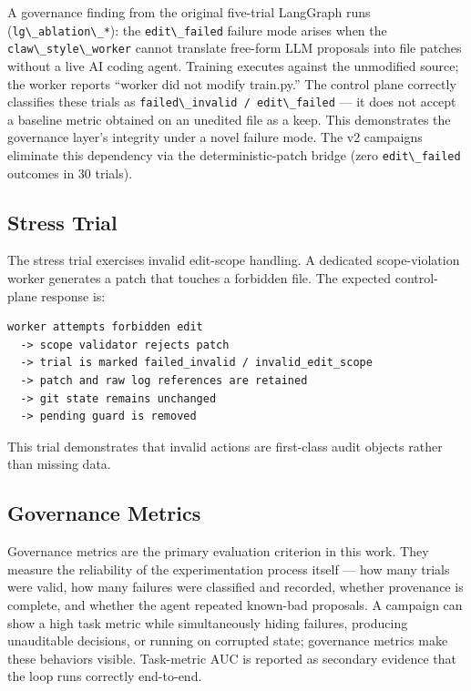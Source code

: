A governance finding from the original five-trial LangGraph runs (\passthrough{\lstinline!lg\_ablation\_*!}): the \passthrough{\lstinline!edit\_failed!} failure mode arises when the \passthrough{\lstinline!claw\_style\_worker!} cannot translate free-form LLM proposals into file patches without a live AI coding agent. Training executes against the unmodified source; the worker reports ``worker did not modify train.py.'' The control plane correctly classifies these trials as \passthrough{\lstinline!failed\_invalid / edit\_failed!} --- it does not accept a baseline metric obtained on an unedited file as a keep. This demonstrates the governance layer's integrity under a novel failure mode. The v2 campaigns eliminate this dependency via the deterministic-patch bridge (zero \passthrough{\lstinline!edit\_failed!} outcomes in 30 trials).

\subsection{Stress Trial}\label{stress-trial}

The stress trial exercises invalid edit-scope handling. A dedicated scope-violation worker generates a patch that touches a forbidden file. The expected control-plane response is:

\begin{lstlisting}
worker attempts forbidden edit
  -> scope validator rejects patch
  -> trial is marked failed_invalid / invalid_edit_scope
  -> patch and raw log references are retained
  -> git state remains unchanged
  -> pending guard is removed
\end{lstlisting}

This trial demonstrates that invalid actions are first-class audit objects rather than missing data.

\subsection{Governance Metrics}\label{governance-metrics}

Governance metrics are the primary evaluation criterion in this work. They measure the reliability of the experimentation process itself --- how many trials were valid, how many failures were classified and recorded, whether provenance is complete, and whether the agent repeated known-bad proposals. A campaign can show a high task metric while simultaneously hiding failures, producing unauditable decisions, or running on corrupted state; governance metrics make these behaviors visible. Task-metric AUC is reported as secondary evidence that the loop runs correctly end-to-end.

